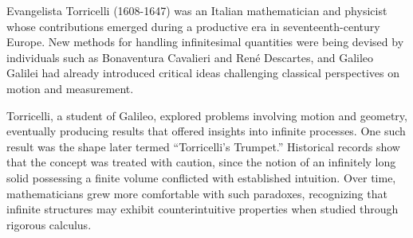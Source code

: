 
\begin{historical}
Evangelista Torricelli (1608-1647) was an Italian mathematician and physicist whose contributions emerged during a productive era in seventeenth-century Europe. New methods for handling infinitesimal quantities were being devised by individuals such as Bonaventura Cavalieri and René Descartes, and Galileo Galilei had already introduced critical ideas challenging classical perspectives on motion and measurement.

Torricelli, a student of Galileo, explored problems involving motion and geometry, eventually producing results that offered insights into infinite processes. One such result was the shape later termed “Torricelli’s Trumpet.” Historical records show that the concept was treated with caution, since the notion of an infinitely long solid possessing a finite volume conflicted with established intuition. Over time, mathematicians grew more comfortable with such paradoxes, recognizing that infinite structures may exhibit counterintuitive properties when studied through rigorous calculus.
\end{historical}
